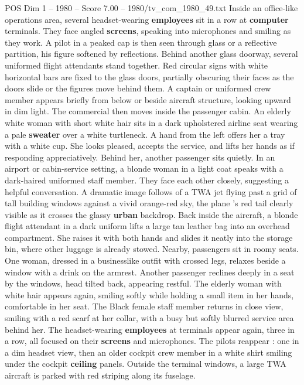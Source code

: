 \begin{textsample}{POS Dim 1 – 1980 – Score 7.00 – 1980/tv\_com\_1980\_49.txt}
Inside an office-like operations area, several headset-wearing \textbf{employees} sit in a row at \textbf{computer} terminals.
They face angled \textbf{screens}, speaking into microphones and smiling as they work.
A pilot in a peaked cap is then seen through glass or a reflective partition, his figure softened by reflections.
Behind another glass doorway, several uniformed flight attendants stand together.
Red circular signs with white horizontal bars are fixed to the glass doors, partially obscuring their faces as the doors slide or the figures move behind them.
A captain or uniformed crew member appears briefly from below or beside aircraft structure, looking upward in dim light.
The commercial then moves inside the passenger cabin.
An elderly white woman with short white hair sits in a dark upholstered airline seat wearing a pale \textbf{sweater} over a white turtleneck.
A hand from the left offers her a tray with a white cup.
She looks pleased, accepts the service, and lifts her hands as if responding appreciatively.
Behind her, another passenger sits quietly.
In an airport or cabin-service setting, a blonde woman in a light coat speaks with a dark-haired uniformed staff member.
They face each other closely, suggesting a helpful conversation.
A dramatic image follows of a TWA jet flying past a grid of tall building windows against a vivid orange-red sky, the plane ’s red tail clearly visible as it crosses the glassy \textbf{urban} backdrop.
Back inside the aircraft, a blonde flight attendant in a dark uniform lifts a large tan leather bag into an overhead compartment.
She raises it with both hands and slides it neatly into the storage bin, where other luggage is already stowed.
Nearby, passengers sit in roomy seats.
One woman, dressed in a businesslike outfit with crossed legs, relaxes beside a window with a drink on the armrest.
Another passenger reclines deeply in a seat by the windows, head tilted back, appearing restful.
The elderly woman with white hair appears again, smiling softly while holding a small item in her hands, comfortable in her seat.
The Black female staff member returns in close view, smiling with a red scarf at her collar, with a busy but softly blurred service area behind her.
The headset-wearing \textbf{employees} at terminals appear again, three in a row, all focused on their \textbf{screens} and microphones.
The pilots reappear : one in a dim headset view, then an older cockpit crew member in a white shirt smiling under the cockpit \textbf{ceiling} panels.
Outside the terminal windows, a large TWA aircraft is parked with red striping along its fuselage.

\end{textsample}
